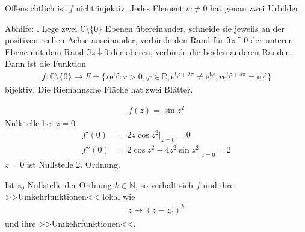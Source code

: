 Offensichtlich ist $f$ nicht injektiv. Jedes Element $w \neq 0$ hat genau zwei Urbilder.

Abhilfe: . Lege zwei $\mathbb{C} \setminus \{ 0 \}$ Ebenen übereinander, schneide sie jeweils an der positiven reellen Achse auseinander, verbinde den Rand für $\Im z \uparrow 0$ der unteren Ebene mit dem Rand $\Im z \downarrow 0$ der oberen, verbinde die beiden anderen Ränder. Dann ist die Funktion
%
\begin{align*}
  f : \mathbb{C} \setminus \{0\} \to F = \{ r \mathrm{e}^{\mathrm{i} \varphi} : r > 0, \varphi \in \mathbb{R}, \mathrm{e}^{\mathrm{i} \varphi + 2 \pi} \neq \mathrm{e}^{\mathrm{i} \varphi}, r \mathrm{e}^{\mathrm{i} \varphi + 4 \pi} = \mathrm{e}^{\mathrm{i} \varphi} \}
\end{align*}
%
bijektiv. Die Riemannsche Fläche hat zwei Blätter.


\begin{example*}
  \begin{align*}
    f(z) = \sin z^2
  \end{align*}
  Nullstelle bei $z=0$
  \begin{align*}
    f'(0) &= 2 z \cos z^2 \Big|_{z=0} = 0 \\
    f''(0) &= 2 \cos z^2 - 4 z^2 \sin z^2 \Big|_{z=0} = 2
  \end{align*}
  $z=0$ ist Nullstelle 2. Ordnung.
\end{example*}

\begin{notice*}[Ziel:]
  Ist $z_0$ Nullstelle der Ordnung $k \in \mathbb{N}$, so verhält sich $f$ und ihre >>Umkehrfunktionen<< lokal wie
  \begin{align*}
    z \mapsto (z-z_0)^k
  \end{align*}
  und ihre >>Umkehrfunktionen<<.
\end{notice*}

